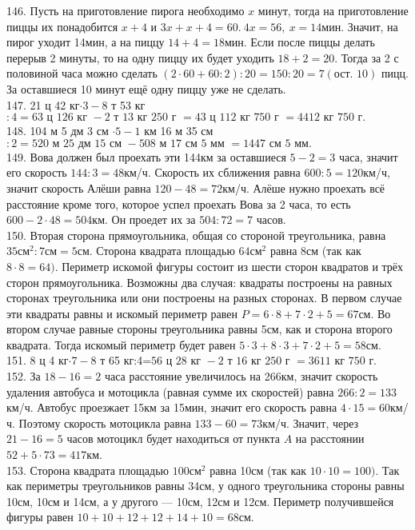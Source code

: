 146. Пусть на приготовление пирога необходимо $x$ минут, тогда на приготовление пиццы их понадобится $x+4$ и $3x+x+4=60.\ 4x=56,\ x=14$мин. Значит, на пирог уходит 14мин, а на пиццу $14+4=18$мин. Если после пиццы делать перерыв 2 минуты, то на одну пиццу их будет уходить $18+2=20.$ Тогда за 2 с половиной часа можно сделать $(2\cdot60+60:2):20=150:20=7 (\text{ост. 10})$ пицц. За оставшиеся 10 минут ещё одну пиццу уже не сделать.\\
147. 21 ц 42 кг$\cdot3-8$ т 53 кг$:4=63\text{ ц }126\text{ кг }-2\text{ т }13\text{ кг }250\text{ г }=43\text{ ц }112\text{ кг }750\text{ г }=4412\text{ кг }750\text{ г}.$\\
148. 104 м 5 дм 3 см $\cdot 5-1$ км 16 м 35 см$:2=520\text{ м }25\text{ дм }15\text{ см }-508\text{ м }17\text{ см }5\text{ мм }=1447\text{ см }5\text{ мм}.$\\
149. Вова должен был проехать эти 144км за оставшиеся $5-2=3$ часа, значит его скорость $144:3=48$км/ч. Скорость их сближения равна $600:5=120$км/ч, значит скорость Алёши равна $120-48=72$км/ч. Алёше нужно проехать всё расстояние кроме того, которое успел проехать Вова за 2 часа, то есть $600-2\cdot48=504$км. Он проедет их за $504:72=7$ часов.\\
150. Вторая сторона прямоугольника, общая со стороной треугольника, равна $35\text{см}^2:7\text{см}=5$см. Сторона квадрата площадью $64\text{см}^2$ равна 8см (так как $8\cdot8=64).$ Периметр искомой фигуры состоит из шести сторон квадратов и трёх сторон прямоугольника. Возможны два случая: квадраты построены на равных сторонах треугольника или они построены на разных сторонах. В первом случае эти квадраты равны и искомый периметр равен $P=6\cdot8+7\cdot2+5=67$см. Во втором случае равные стороны треугольника равны 5см, как и сторона второго квадрата. Тогда искомый периметр будет равен $5\cdot3+8\cdot3+7\cdot2+5=58$см.\\
151. 8 ц 4 кг$\cdot7-8$ т 65 кг:4=$56\text{ ц }28\text{ кг }-2\text{ т }16\text{ кг }250\text{ г }=3611\text{ кг }750\text{ г.}$\\
152. За $18-16=2$ часа расстояние увеличилось на 266км, значит скорость удаления автобуса и мотоцикла (равная сумме их скоростей) равна $266:2=133$км/ч. Автобус проезжает 15км за 15мин, значит его скорость равна $4\cdot15=60$км/ч. Поэтому скорость мотоцикла равна $133-60=73$км/ч. Значит, через $21-16=5$ часов мотоцикл будет находиться от пункта $A$ на расстоянии $52+5\cdot73=417$км.\\
153. Сторона квадрата площадью $100\text{см}^2$ равна 10см (так как $10\cdot10=100).$ Так как периметры треугольников равны 34см, у одного треугольника стороны равны 10см, 10см и 14см, а у другого --- 10см, 12см и 12см. Периметр получившейся фигуры равен $10+10+12+12+14+10=68$см.\\
